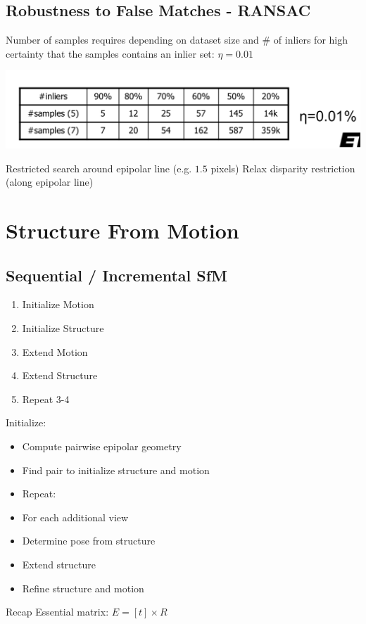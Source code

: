 \begin{enumerate}
\subsection{Robustness to False Matches - RANSAC}

Number of samples requires depending on dataset size and \# of inliers for high certainty that the samples contains an inlier set:
$\eta = 0.01$

\includegraphics[width=0.9\columnwidth]{cv_figures/ransac.png}

Restricted search around epipolar line (e.g. $1.5$ pixels)
Relax disparity restriction (along epipolar line)

\section{Structure From Motion}
\subsection{Sequential / Incremental SfM}

\begin{enumerate}
\item  Initialize Motion
\item  Initialize Structure
\item  Extend Motion
\item  Extend Structure
\item Repeat 3-4
\end{enumerate}

Initialize:
\begin{itemize}
\item Compute pairwise epipolar geometry
\item Find pair to initialize structure and motion
\item Repeat:
\item For each additional view
\item Determine pose from structure 
\item Extend structure
\item Refine structure and motion
\end{itemize}

Recap Essential matrix:  $E=[t]\times R$


\end{enumerate}
